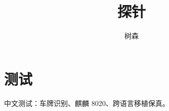 \documentclass[UTF8]{ctexart}
\begin{document}
\title{探针}
\author{树森}
\maketitle
\section{测试}
中文测试：车牌识别、麒麟 8020、跨语言移植保真。
\end{document}
